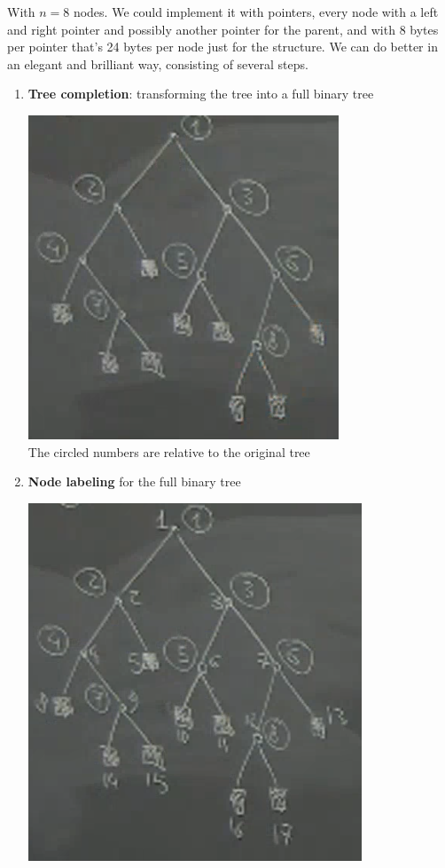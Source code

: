 \documentclass[10pt]{report}
\begin{document}
With $n=8$ nodes. We could implement it with pointers, every node with a left and right pointer and possibly another pointer for the parent, and with 8 bytes per pointer that's 24 bytes per node just for the structure. We can do better in an elegant and brilliant way, consisting of several steps.\begin{enumerate}
	\item \textbf{Tree completion}: transforming the tree into a full binary tree\begin{center}
		\includegraphics[scale=0.5]{15.png}\\
		The circled numbers are relative to the original tree
	\end{center}
	\item \textbf{Node labeling} for the full binary tree \begin{center}
		\includegraphics[scale=0.5]{16.png}

\end{center}
\end{enumerate}
\end{document}
